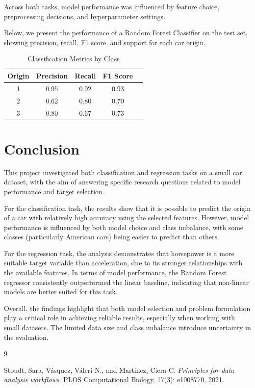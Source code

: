 \documentclass[a4paper, twocolumn]{article}
\begin{document}
Across both tasks, model performance was influenced by feature choice, preprocessing decisions, and hyperparameter settings. 

Below, we present the performance of a Random Forest Classifier on the test set, showing precision, recall, F1 score, and support for each car origin.

\begin{table}[H]
\centering
\caption{Classification Metrics by Class}
\begin{tabular}{c|c|c|c|c}
\hline
\textbf{Origin} & \textbf{Precision} & \textbf{Recall} & \textbf{F1 Score} \\
\hline
1 & 0.95 & 0.92 & 0.93 \\
2 & 0.62 & 0.80 & 0.70 \\
3 & 0.80 & 0.67 & 0.73 \\
\hline
\end{tabular}
\label{tab:class_metrics}
\end{table}

\section{Conclusion}
This project investigated both classification and regression tasks on a small car dataset, with the aim of answering specific research questions related to model performance and target selection.

For the classification task, the results show that it is possible to predict the origin of a car with relatively high accuracy using the selected features. However, model performance is influenced by both model choice and class imbalance, with some classes (particularly American cars) being easier to predict than others.

For the regression task, the analysis demonstrates that horsepower is a more suitable target variable than acceleration, due to its stronger relationships with the available features. In terms of model performance, the Random Forest regressor consistently outperformed the linear baseline, indicating that non-linear models are better suited for this task.

Overall, the findings highlight that both model selection and problem formulation play a critical role in achieving reliable results, especially when working with small datasets. The limited data size and class imbalance introduce uncertainty in the evaluation.

\begin{thebibliography}{9}

Stoudt, Sara, V{\'a}squez, V{\'a}leri N., and Martinez, Ciera C. 
\textit{Principles for data analysis workflows}. 
PLOS Computational Biology, 17(3): e1008770, 2021.

\end{thebibliography}
\end{document}
